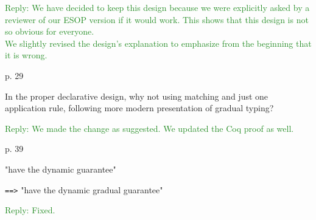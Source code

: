 \documentclass[dvipsnames]{article}
\newcommand\reply[1]{\textcolor{ForestGreen}{Reply: #1}}
\begin{document}
\reply{We have decided to keep this design because we were explicitly asked by a reviewer of our ESOP
  version if it would work. This shows that this design is not so
  obvious for everyone.\\
  We slightly revised the design's explanation to emphasize from
  the beginning that it is wrong.}

p. 29 

In the proper declarative design, why not using matching and just one
application rule, following more modern presentation of gradual typing?

\reply{We made the change as suggested. We updated the Coq proof as well.}


p. 39 

"have the dynamic guarantee"

\verb|==>|
"have the dynamic gradual guarantee"

\reply{Fixed.}
\end{document}
